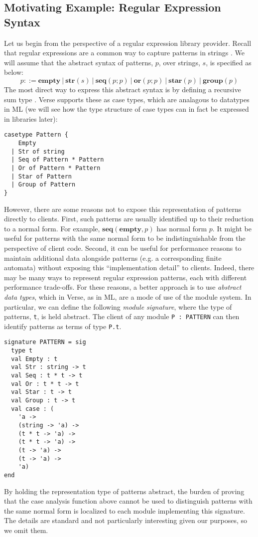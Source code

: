 \subsection{Motivating Example: Regular Expression Syntax}\label{sec:examples}
Let us begin from the perspective of a regular expression library provider. Recall that regular expressions are a common way to capture patterns in strings \cite{Thompson:1968:PTR:363347.363387}. We will assume that the abstract syntax of {patterns}, $p$, over strings, $s$, is specified as below:\[p ::= \textbf{empty} ~|~ \textbf{str}(s) ~|~ \textbf{seq}(p; p) ~|~ \textbf{or}(p; p) ~|~ \textbf{star}(p) ~|~ \textbf{group}(p)\]
The most direct way to express this abstract syntax is by defining a recursive sum type \cite{pfpl}. Verse supports these as case types, which are analagous to datatypes in ML (we will see how the type structure  of case types can in fact be expressed in libraries later):

\begin{lstlisting}[numbers=none]
casetype Pattern {
    Empty
  | Str of string
  | Seq of Pattern * Pattern
  | Or of Pattern * Pattern
  | Star of Pattern
  | Group of Pattern
}
\end{lstlisting}

However, there are some reasons not to expose this representation of patterns directly to clients. First, such patterns are usually identified up to their reduction to a normal form. For example, $\textbf{seq}(\textbf{empty}, p)$ has normal form $p$. It might be useful for patterns with the same normal form to be  indistinguishable from the perspective of client code. Second, it can be useful for performance reasons to maintain additional data alongside patterns (e.g. a corresponding finite automata) without exposing this ``implementation detail'' to clients. Indeed, there may be many ways to represent regular expression patterns, each with different performance trade-offs. For these reasons, a better approach is to use \emph{abstract data types}, which in Verse, as in ML, are a mode of use of the module system. In particular, we can define the following \emph{module signature}, where the type of patterns, \lstinline{t}, is held abstract. The client of any module \lstinline{P : PATTERN} can then identify patterns as terms of type \verb|P.t|. 

\begin{lstlisting}[deletekeywords={case},numbers=none]
signature PATTERN = sig 
  type t
  val Empty : t
  val Str : string -> t
  val Seq : t * t -> t
  val Or : t * t -> t
  val Star : t -> t
  val Group : t -> t
  val case : (
    'a -> 
    (string -> 'a) ->
    (t * t -> 'a) ->
    (t * t -> 'a) ->
    (t -> 'a) ->
    (t -> 'a) -> 
    'a)
end
\end{lstlisting}
By holding the representation type of patterns abstract, the burden of proving that the case analysis function above cannot be used to distinguish patterns with the same normal form is localized to each module implementing this signature. The details are standard and not particularly interesting given our purposes, so we omit them.

